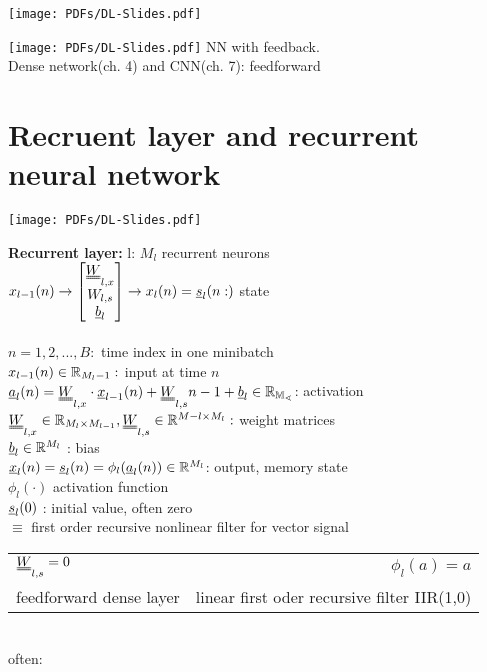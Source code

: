 \texttt{[image: PDFs/DL-Slides.pdf]}

\texttt{[image: PDFs/DL-Slides.pdf]}
NN with feedback.\\
Dense network(ch. 4) and CNN(ch. 7): feedforward
\section{Recruent layer and recurrent neural network}
\texttt{[image: PDFs/DL-Slides.pdf]}

\textbf{Recurrent layer: }l: $ M_l $ recurrent neurons\\
$x_{l-1} (n) \rightarrow  \left[\begin{matrix}
\W_{l,x }\\
W_{l,s} \\
\b_l 
\end{matrix} \right]  \rightarrow x_l(n) = \s_l (n :)$ state \\
\\
$ n= 1,2, ..., B: $ time index in one minibatch \\
$  x_{l-1}(n ) \in \mathbb R_{M_l -1 }:  $ input at time $  n $\\
$ \a_l (n) = \W _{l,x } \cdot \x_{l-1 } (n) + \W_{l,s} \sl n-1    + \b_l \in \R_{M_l} $: activation\\
$ \W_{l,x } \in \R _{M_l \times M_{l-1 }} , \W_{l,s } \in \R ^{M-l \times M_l } : $ weight matrices \\
$  {\underline b}_l \in \mathbb R^{M_l } $ : bias \\
 $ {\underline x}_l (n) = {\underline s}_l (n) = \phi_l ({\underline a}_l (n)) \in \mathbb R ^{M_l } $: output, memory state \\
 $  \phi_l (\cdot ) $ activation function \\
 $  {\underline s}_l  (0 ) $ : initial value, often zero \\
 $  \equiv  $ first order recursive nonlinear filter for vector signal\\
 \begin{tabular}{lr}
 	$ \W_{l,s} = 0 $ & $  \phi_l(a) = a  $\\
 	feedforward dense layer & linear first oder recursive filter IIR(1,0)
 \end{tabular}\\
often:\\
